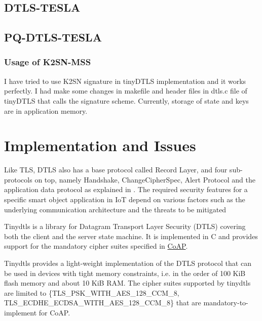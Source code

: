 \subsection{DTLS-TESLA}

\subsection{PQ-DTLS-TESLA}
\subsubsection{Usage of K2SN-MSS} I have tried to use K2SN signature in tinyDTLS implementation and it works perfectly. I had make some changes in makefile and header files in dtls.c file of tinyDTLS that calls the signature scheme. Currently, storage of state and keys are in application memory.

\section{Implementation and Issues }
Like  TLS,  DTLS  also  has a  base  protocol  called  Record Layer,  and  four  sub-protocols  on  top,  namely  Handshake, ChangeCipherSpec,  Alert  Protocol and the  application  data protocol as explained in \cite{rescorla2012rfc}. The required security features for a specific  smart  object  application in  IoT depend  on  various factors such as the underlying communication architecture and the threats to be mitigated

Tinydtls \cite{tinydtls1}\cite{tinydtls2} is a library for Datagram Transport Layer Security (DTLS) covering both the client and the server state machine. It is implemented in C and provides support for the mandatory cipher suites specified in \href{https://tools.ietf.org/html/rfc7252}{CoAP}.

Tinydtls provides a light-weight implementation of the DTLS protocol that can be used in devices with tight memory constraints, i.e. in the order of 100 KiB flash memory and about 10 KiB RAM. The cipher suites supported by tinydtls are limited to \{TLS\_PSK\_WITH\_AES\_128\_CCM\_8, TLS\_ECDHE\_ECDSA\_WITH\_AES\_128\_CCM\_8\} that are mandatory-to-implement for CoAP. 

